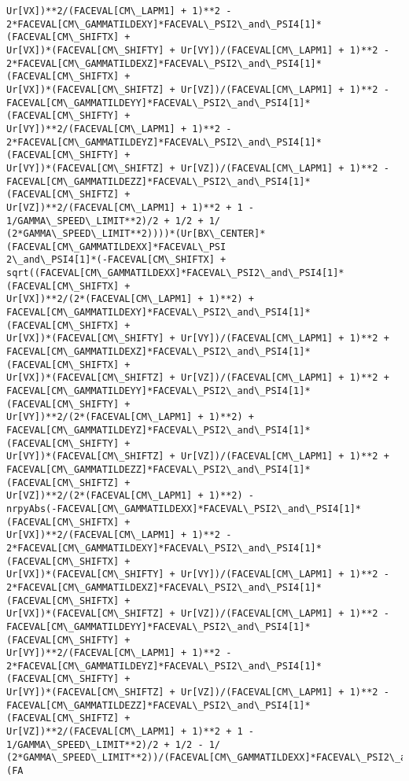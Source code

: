 \documentclass[landscape,letterpaper,10pt,english]{article}
\begin{document}
\begin{Verbatim}[commandchars=\\\{\}]
Ur[VX])**2/(FACEVAL[CM\_LAPM1] + 1)**2 -
2*FACEVAL[CM\_GAMMATILDEXY]*FACEVAL\_PSI2\_and\_PSI4[1]*(FACEVAL[CM\_SHIFTX] +
Ur[VX])*(FACEVAL[CM\_SHIFTY] + Ur[VY])/(FACEVAL[CM\_LAPM1] + 1)**2 -
2*FACEVAL[CM\_GAMMATILDEXZ]*FACEVAL\_PSI2\_and\_PSI4[1]*(FACEVAL[CM\_SHIFTX] +
Ur[VX])*(FACEVAL[CM\_SHIFTZ] + Ur[VZ])/(FACEVAL[CM\_LAPM1] + 1)**2 -
FACEVAL[CM\_GAMMATILDEYY]*FACEVAL\_PSI2\_and\_PSI4[1]*(FACEVAL[CM\_SHIFTY] +
Ur[VY])**2/(FACEVAL[CM\_LAPM1] + 1)**2 -
2*FACEVAL[CM\_GAMMATILDEYZ]*FACEVAL\_PSI2\_and\_PSI4[1]*(FACEVAL[CM\_SHIFTY] +
Ur[VY])*(FACEVAL[CM\_SHIFTZ] + Ur[VZ])/(FACEVAL[CM\_LAPM1] + 1)**2 -
FACEVAL[CM\_GAMMATILDEZZ]*FACEVAL\_PSI2\_and\_PSI4[1]*(FACEVAL[CM\_SHIFTZ] +
Ur[VZ])**2/(FACEVAL[CM\_LAPM1] + 1)**2 + 1 - 1/GAMMA\_SPEED\_LIMIT**2)/2 + 1/2 + 1/
(2*GAMMA\_SPEED\_LIMIT**2))))*(Ur[BX\_CENTER]*(FACEVAL[CM\_GAMMATILDEXX]*FACEVAL\_PSI
2\_and\_PSI4[1]*(-FACEVAL[CM\_SHIFTX] +
sqrt((FACEVAL[CM\_GAMMATILDEXX]*FACEVAL\_PSI2\_and\_PSI4[1]*(FACEVAL[CM\_SHIFTX] +
Ur[VX])**2/(2*(FACEVAL[CM\_LAPM1] + 1)**2) +
FACEVAL[CM\_GAMMATILDEXY]*FACEVAL\_PSI2\_and\_PSI4[1]*(FACEVAL[CM\_SHIFTX] +
Ur[VX])*(FACEVAL[CM\_SHIFTY] + Ur[VY])/(FACEVAL[CM\_LAPM1] + 1)**2 +
FACEVAL[CM\_GAMMATILDEXZ]*FACEVAL\_PSI2\_and\_PSI4[1]*(FACEVAL[CM\_SHIFTX] +
Ur[VX])*(FACEVAL[CM\_SHIFTZ] + Ur[VZ])/(FACEVAL[CM\_LAPM1] + 1)**2 +
FACEVAL[CM\_GAMMATILDEYY]*FACEVAL\_PSI2\_and\_PSI4[1]*(FACEVAL[CM\_SHIFTY] +
Ur[VY])**2/(2*(FACEVAL[CM\_LAPM1] + 1)**2) +
FACEVAL[CM\_GAMMATILDEYZ]*FACEVAL\_PSI2\_and\_PSI4[1]*(FACEVAL[CM\_SHIFTY] +
Ur[VY])*(FACEVAL[CM\_SHIFTZ] + Ur[VZ])/(FACEVAL[CM\_LAPM1] + 1)**2 +
FACEVAL[CM\_GAMMATILDEZZ]*FACEVAL\_PSI2\_and\_PSI4[1]*(FACEVAL[CM\_SHIFTZ] +
Ur[VZ])**2/(2*(FACEVAL[CM\_LAPM1] + 1)**2) -
nrpyAbs(-FACEVAL[CM\_GAMMATILDEXX]*FACEVAL\_PSI2\_and\_PSI4[1]*(FACEVAL[CM\_SHIFTX] +
Ur[VX])**2/(FACEVAL[CM\_LAPM1] + 1)**2 -
2*FACEVAL[CM\_GAMMATILDEXY]*FACEVAL\_PSI2\_and\_PSI4[1]*(FACEVAL[CM\_SHIFTX] +
Ur[VX])*(FACEVAL[CM\_SHIFTY] + Ur[VY])/(FACEVAL[CM\_LAPM1] + 1)**2 -
2*FACEVAL[CM\_GAMMATILDEXZ]*FACEVAL\_PSI2\_and\_PSI4[1]*(FACEVAL[CM\_SHIFTX] +
Ur[VX])*(FACEVAL[CM\_SHIFTZ] + Ur[VZ])/(FACEVAL[CM\_LAPM1] + 1)**2 -
FACEVAL[CM\_GAMMATILDEYY]*FACEVAL\_PSI2\_and\_PSI4[1]*(FACEVAL[CM\_SHIFTY] +
Ur[VY])**2/(FACEVAL[CM\_LAPM1] + 1)**2 -
2*FACEVAL[CM\_GAMMATILDEYZ]*FACEVAL\_PSI2\_and\_PSI4[1]*(FACEVAL[CM\_SHIFTY] +
Ur[VY])*(FACEVAL[CM\_SHIFTZ] + Ur[VZ])/(FACEVAL[CM\_LAPM1] + 1)**2 -
FACEVAL[CM\_GAMMATILDEZZ]*FACEVAL\_PSI2\_and\_PSI4[1]*(FACEVAL[CM\_SHIFTZ] +
Ur[VZ])**2/(FACEVAL[CM\_LAPM1] + 1)**2 + 1 - 1/GAMMA\_SPEED\_LIMIT**2)/2 + 1/2 - 1/
(2*GAMMA\_SPEED\_LIMIT**2))/(FACEVAL[CM\_GAMMATILDEXX]*FACEVAL\_PSI2\_and\_PSI4[1]*(FA

\end{Verbatim}
\end{document}
